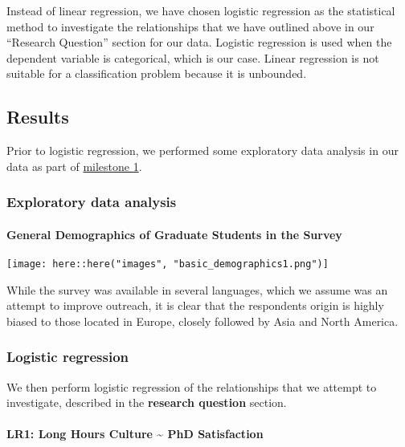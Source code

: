 \documentclass[
]{article}
\begin{document}
Instead of linear regression, we have chosen logistic regression as the
statistical method to investigate the relationships that we have
outlined above in our ``Research Question'' section for our data.
Logistic regression is used when the dependent variable is categorical,
which is our case. Linear regression is not suitable for a
classification problem because it is unbounded.

\hypertarget{results}{%
\subsection{Results}\label{results}}

Prior to logistic regression, we performed some exploratory data
analysis in our data as part of
\href{https://github.com/STAT547-UBC-2019-20/group05/tree/master/docs/milestone-01}{milestone
1}.

\hypertarget{exploratory-data-analysis}{%
\subsubsection{Exploratory data
analysis}\label{exploratory-data-analysis}}

\hypertarget{general-demographics-of-graduate-students-in-the-survey}{%
\paragraph{General Demographics of Graduate Students in the
Survey}\label{general-demographics-of-graduate-students-in-the-survey}}

\texttt{[image: here::here("images", "basic\_demographics1.png")]}

While the survey was available in several languages, which we assume was
an attempt to improve outreach, it is clear that the respondents origin
is highly biased to those located in Europe, closely followed by Asia
and North America.

\hypertarget{logistic-regression}{%
\subsubsection{Logistic regression}\label{logistic-regression}}

We then perform logistic regression of the relationships that we attempt
to investigate, described in the \textbf{research question} section.

\hypertarget{lr1-long-hours-culture-phd-satisfaction}{%
\paragraph{LR1: Long Hours Culture \textasciitilde{} PhD
Satisfaction}\label{lr1-long-hours-culture-phd-satisfaction}}
\end{document}
